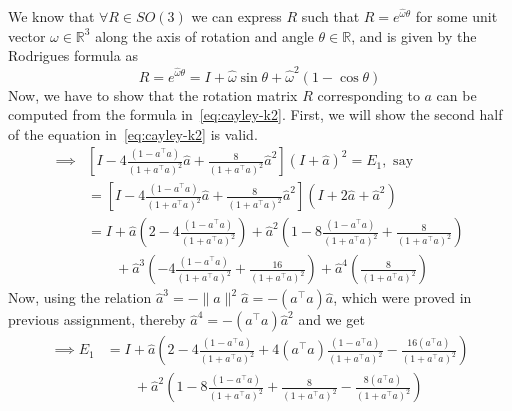 We know that \( \forall R \in SO(3) \) we can express \( R \) such that \( R = e^{\widehat{\omega} \theta} \) for some unit vector \( \omega \in \mathbb{R}^{3} \) along the axis of rotation and angle \( \theta \in \mathbb{R} \), and is given by the Rodrigues formula as
\begin{equation}\label{eq:rodrigues}
    R
    =
    e^{\widehat{\omega} \theta}
    =
    I + \widehat{\omega} \sin \theta + \widehat{\omega}^{2} (1 - \cos \theta)
\end{equation}
Now, we have to show that the rotation matrix \( R \) corresponding to \( a \) can be computed from the formula in~\eqref{eq:cayley-k2}.
First, we will show the second half of the equation in~\eqref{eq:cayley-k2} is valid.
\begin{align*}
    \implies
     &
    \left[
        I
        - 4 \frac{(1 - a^{\top} a)}{{(1 + a^{\top} a)}^{2}} \widehat{a}
        + \frac{8}{{(1 + a^{\top} a)}^{2}} \widehat{a}^{2}
        \right]
    {(I + \widehat{a})}^{2}
    =
    E_1, \text{ say}
    \\ & =
    \left[
        I
        - 4 \frac{(1 - a^{\top} a)}{{(1 + a^{\top} a)}^{2}} \widehat{a}
        + \frac{8}{{(1 + a^{\top} a)}^{2}} \widehat{a}^{2}
        \right]
    (I + 2 \widehat{a} + \widehat{a}^{2})
    \\ & =
    I
    + \widehat{a} \left( 2 - 4 \frac{(1 - a^{\top} a)}{{(1 + a^{\top} a)}^{2}} \right)
    + \widehat{a}^{2} \left( 1 - 8 \frac{(1 - a^{\top} a)}{{(1 + a^{\top} a)}^{2}} + \frac{8}{{(1 + a^{\top} a)}^{2}} \right)
    \\ & \qquad
    + \widehat{a}^{3} \left( -4 \frac{(1 - a^{\top} a)}{{(1 + a^{\top} a)}^{2}} + \frac{16}{{(1 + a^{\top} a)}^{2}} \right)
    + \widehat{a}^{4} \left( \frac{8}{{(1 + a^{\top} a)}^{2}} \right)
\end{align*}
Now, using the relation \( \widehat{a}^{3} = - \| a \|^{2} \widehat{a} = - (a^{\top} a) \widehat{a} \), which were proved in previous assignment, thereby \( \widehat{a}^{4} = - (a^{\top} a) \widehat{a}^{2} \) and we get
\begin{align*}
    \implies
    E_1
     & =
    I
    + \widehat{a} \left( 2 - 4 \frac{(1 - a^{\top} a)}{{(1 + a^{\top} a)}^{2}} + 4 (a^{\top} a) \frac{(1 - a^{\top} a)}{{(1 + a^{\top} a)}^{2}} - \frac{16 (a^{\top} a)}{{(1 + a^{\top} a)}^{2}} \right)
    \\ & \qquad
    + \widehat{a}^{2} \left( 1 - 8 \frac{(1 - a^{\top} a)}{{(1 + a^{\top} a)}^{2}} + \frac{8}{{(1 + a^{\top} a)}^{2}} - \frac{8(a^{\top} a)}{{(1 + a^{\top} a)}^{2}} \right)
\end{align*}
